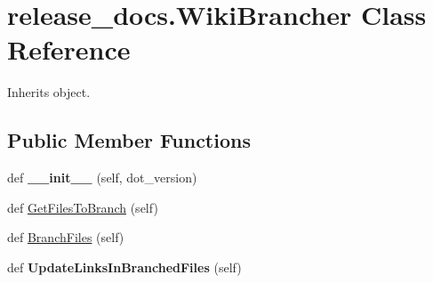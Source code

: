 \hypertarget{classrelease__docs_1_1WikiBrancher}{}\section{release\+\_\+docs.\+Wiki\+Brancher Class Reference}
\label{classrelease__docs_1_1WikiBrancher}


Inherits object.

\subsection*{Public Member Functions}
\begin{DoxyCompactItemize}
\item 
\mbox{\label{classrelease__docs_1_1WikiBrancher_a344b32e2b65f0e8bab9fbf1e670d33fd}} 
def {\bfseries \+\_\+\+\_\+init\+\_\+\+\_\+} (self, dot\+\_\+version)
\item 
def \mbox{\hyperlink{classrelease__docs_1_1WikiBrancher_a05fc4282f501fb0210ecb33fd1d209a6}{Get\+Files\+To\+Branch}} (self)
\item 
def \mbox{\hyperlink{classrelease__docs_1_1WikiBrancher_a5ef284f7e1742f465ecd0c14d2667327}{Branch\+Files}} (self)
\item 
\mbox{\label{classrelease__docs_1_1WikiBrancher_aa0bc4b1b78426fe7a8496d570b540f1d}} 
def {\bfseries Update\+Links\+In\+Branched\+Files} (self)
\end{DoxyCompactItemize}
